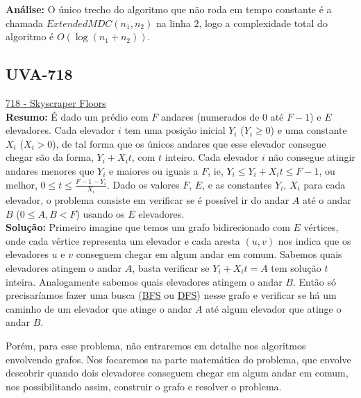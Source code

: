 \textbf{Análise:}
O único trecho do algoritmo que não roda em tempo constante é a chamada $ExtendedMDC(n_1,n_2)$ na linha $2$, logo a complexidade total do algoritmo é $O(\log(n_1+n_2))$.
\newline




\subsection{UVA-718}
\href{https://uva.onlinejudge.org/index.php?option=com_onlinejudge&Itemid=8&page=show_problem&problem=659}{718 - Skyscraper Floors}\\

\textbf{Resumo:}
É dado um prédio com $F$ andares (numerados de $0$ até $F-1$) e $E$ elevadores. Cada elevador $i$ tem uma posição inicial $Y_i$ ($Y_i \geq 0$) e uma constante $X_i$ ($X_i > 0$), 
de tal forma que os únicos andares que esse elevador consegue chegar são da forma, $Y_i+X_it$, com $t$ inteiro. 
Cada elevador $i$ não consegue atingir andares menores que $Y_i$ e maiores ou iguais a $F$, ie, $Y_i \leq Y_i+X_it \leq F-1$, ou melhor, $0 \leq t \leq \frac{F-1-Y_i}{X_i}$.
Dado os valores $F$, $E$, e as constantes $Y_i$, $X_i$ para cada elevador, o problema consiste em verificar se é possível ir do andar $A$ até o andar $B$ ($0\leq A,B <F$)
usando os $E$ elevadores.
\\

\textbf{Solução:} 
Primeiro imagine que temos um grafo bidirecionado com $E$ vértices, onde cada vértice representa um elevador e cada aresta $(u,v)$ nos indica que os elevadores $u$ e $v$ 
conseguem chegar em algum andar em comum.
Sabemos quais elevadores atingem o andar $A$, basta verificar se $Y_i+X_it=A$ tem solução $t$ inteira. Analogamente sabemos quais elevadores atingem o andar
$B$. Então só precisaríamos fazer uma busca (\href{https://en.wikipedia.org/wiki/Breadth-first_search}{BFS} ou \href{https://en.wikipedia.org/wiki/Depth-first_search}{DFS})
nesse grafo e verificar se há um caminho de um elevador que atinge o andar $A$ até algum elevador que atinge o andar $B$.

Porém, para esse problema, não entraremos em detalhe nos algoritmos envolvendo grafos. Nos focaremos na parte matemática do problema, que envolve descobrir quando dois elevadores conseguem chegar em algum andar em comum, nos possibilitando assim, construir o grafo e resolver o problema.

